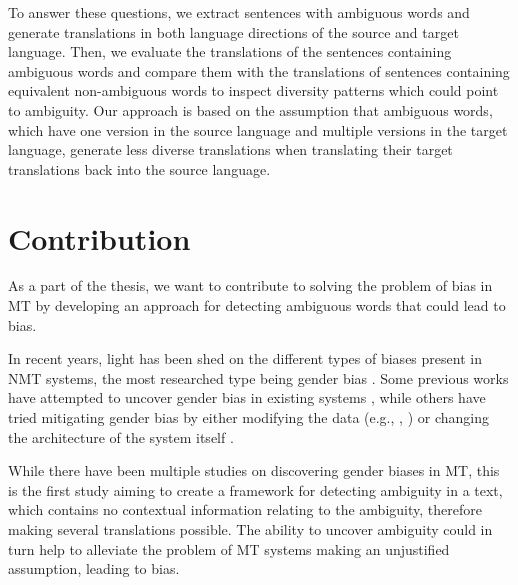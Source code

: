 To answer these questions, we extract sentences with ambiguous words and generate translations in both language directions of the source and target language. Then, we evaluate the translations of the sentences containing ambiguous words and compare them with the translations of sentences containing equivalent non-ambiguous words to inspect diversity patterns which could point to ambiguity. Our approach is based on the assumption that ambiguous words, which have one version in the source language and multiple versions in the target language, generate less diverse translations when translating their target translations back into the source language.


\section{Contribution}
\label{sec:Introduction:Contribution}

As a part of the thesis, we want to contribute to solving the problem of bias in MT by developing an approach for detecting ambiguous words that could lead to bias. 

In recent years, light has been shed on the different types of biases present in NMT systems, the most researched type being gender bias \parencite{Savoldi_2021}. Some previous works have attempted to uncover gender bias in existing systems \parencite{Prates_2019}, while others have tried mitigating gender bias by either modifying the data (e.g., \citet{Escud_Font_2019}, \citet{Stanovsky_2019}) or changing the architecture of the system itself \parencite{Vanmassenhove_2018}. 

While there have been multiple studies on discovering gender biases in MT, this is the first study aiming to create a framework for detecting ambiguity in a text, which contains no contextual information relating to the ambiguity, therefore making several translations possible. The ability to uncover ambiguity could in turn help to alleviate the problem of MT systems making an unjustified assumption, leading to bias.


\enlargethispage{\baselineskip}

